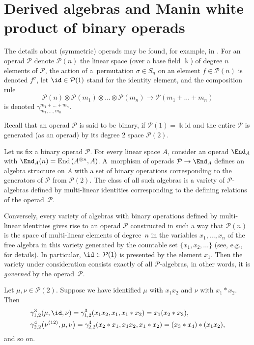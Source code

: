 \section{Derived algebras and Manin white product of binary operads}

The details about (symmetric) operads may be found, for example,
in \cite{Bremner-Dotsenko}.
For an operad $\mathcal P$ denote
$\mathcal P(n)$ the linear space (over a base field $\Bbbk $)
of degree $n$ elements of $\mathcal P$, the action of a~permutation $\sigma \in S_n$
on an element $f\in \mathcal P(n)$ is denoted $f^\sigma $,
let $\id \in \mathcal P(1) $ stand for the identity element,
and the composition rule
\[
\mathcal P(n)\otimes \mathcal P(m_1)\otimes \dots \otimes \mathcal P(m_n) \to \mathcal P(m_1+\dots + m_n)
\]
is denoted $\gamma^{m_1+\dots+m_n}_{m_1,\dots , m_n}$.

Recall that an operad $\mathcal P$ is said to be binary, if
$\mathcal P(1)=\Bbbk \mathrm{id}$ and the entire
$\mathcal P$ is generated (as an operad) by its degree 2 space
$\mathcal P(2)$.

Let us fix a binary operad $\mathcal P$.
For every
linear space $A$, consider an operad
$\End_A$
with $\End_A(n)=\mathrm{End}\,(A^{\otimes n}, A)$.
A~morphism of operads
$\mathcal P \to \End_A$ defines an algebra structure
on $A$ with a set of binary operations corresponding
to the generators of $\mathcal P$ from $\mathcal P(2)$.
The class of all such algebras is a variety
 of $\mathcal P$-algebras
defined by multi-linear identities corresponding
to the defining relations of the operad~$\mathcal P$.

Conversely, every variety of algebras with binary operations
defined by multi-linear identities gives rise to
an operad $\mathcal P$ constructed in such a way that
$\mathcal P(n)$ is the space of multi-linear elements
of degree~$n$ in the variables $x_1,\ldots, x_n$
of the free algebra in this variety generated by the countable set
$\{x_1,x_2,\ldots \}$
(see, e.g., \cite[Section~1.3.5]{Kol2008_smz} for details).
In particular, $\id\in \mathcal P(1)$
is presented by the element $x_1$.
Then the variety under consideration consists
exactly of all $\mathcal P$-algebras, in other words, it is
{\em governed} by the operad~$\mathcal P$.

\begin{Example}
Let $\mu,\nu \in \mathcal P(2)$. Suppose we have identified
$\mu $ with $x_1x_2$ and $\nu $ with $x_1*x_2$.
Then{\samepage
\begin{gather*}
\begin{split}
&\gamma^3_{1,2}(\mu, \id, \nu )
= \gamma^3_{1,2} (x_1x_2, x_1, x_1*x_2)
= x_1(x_2*x_3),
\\
&\gamma^4_{2,2}\bigl(\nu^{(12)}, \mu, \nu \bigr)
= \gamma^4_{2,2}(x_2*x_1, x_1x_2, x_1*x_2)
= (x_3*x_4)*(x_1x_2),
\end{split}
\end{gather*}
and so on.}
\end{Example}

